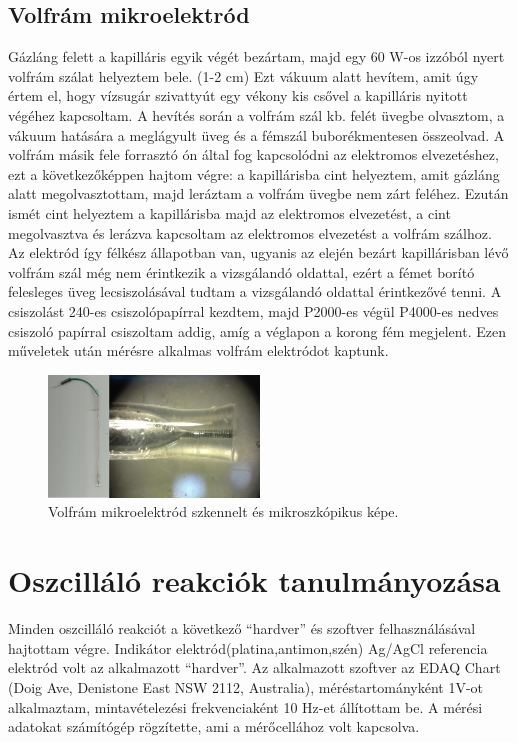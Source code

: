 \subsection{Volfrám mikroelektród}
Gázláng felett a kapilláris egyik végét bezártam, majd egy 60 W-os izzóból nyert volfrám szálat helyeztem bele. (1-2 cm) Ezt vákuum alatt hevítem, amit úgy értem el, hogy vízsugár szivattyút egy vékony kis csővel a kapilláris nyitott végéhez kapcsoltam. A hevítés során a volfrám szál kb. felét üvegbe olvasztom, a vákuum hatására a meglágyult üveg és a fémszál buborékmentesen összeolvad. A volfrám másik fele forrasztó ón által fog kapcsolódni az elektromos elvezetéshez, ezt a következőképpen hajtom végre: a kapillárisba cint helyeztem, amit gázláng alatt megolvasztottam, majd leráztam a volfrám üvegbe nem zárt feléhez. Ezután ismét cint helyeztem a kapillárisba majd az elektromos elvezetést, a cint megolvasztva és lerázva kapcsoltam az elektromos elvezetést a volfrám szálhoz.
Az elektród így félkész állapotban van, ugyanis az elején bezárt kapillárisban lévő volfrám szál még nem érintkezik a vizsgálandó oldattal, ezért a fémet borító felesleges üveg lecsiszolásával tudtam a vizsgálandó oldattal érintkezővé tenni. A csiszolást 240-es csiszolópapírral kezdtem, majd P2000-es végül P4000-es nedves csiszoló papírral csiszoltam addig, amíg a véglapon a korong fém megjelent. Ezen műveletek után mérésre alkalmas volfrám elektródot kaptunk.
\begin{figure}[h]
\centering
\includegraphics[width=0.5\textwidth]{img/volfram.png}
\caption{Volfrám mikroelektród szkennelt és mikroszkópikus képe.}
\label{fig:ionophores}
\end{figure}

\section{Oszcilláló reakciók tanulmányozása}

Minden oszcilláló reakciót a következő “hardver” és szoftver felhasználásával hajtottam végre. Indikátor elektród(platina,antimon,szén) Ag/AgCl referencia elektród volt az alkalmazott “hardver”.  Az alkalmazott szoftver az EDAQ Chart (Doig Ave, Denistone East NSW 2112, Australia),  méréstartományként 1V-ot alkalmaztam, mintavételezési frekvenciaként 10 Hz-et állítottam be. A mérési adatokat számítógép rögzítette, ami a mérőcellához volt kapcsolva.



